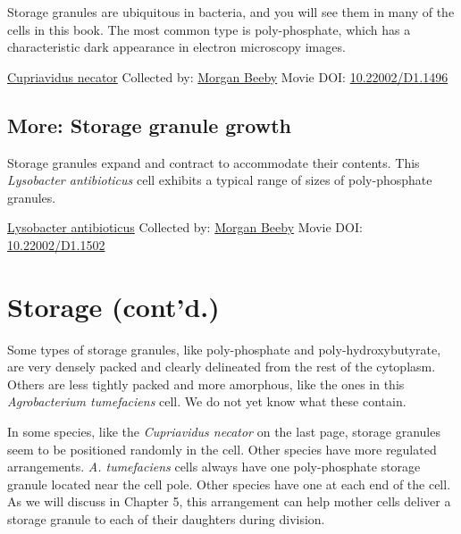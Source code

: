 \documentclass[]{tufte-book}
\begin{document}
Storage granules are ubiquitous in bacteria, and you will see them in many of the cells in this book. The most common type is poly-phosphate, which has a characteristic dark appearance in electron microscopy images.



\hypertarget{htmlwidget-879d68264eb224ebae14}{}

\label{fig:4-8}\protect\hyperlink{tree}{Cupriavidus necator} Collected by: \protect\hyperlink{morgan_beeby}{Morgan Beeby} Movie DOI: \href{https://doi.org/10.22002/D1.1496}{10.22002/D1.1496}

\hypertarget{Storage_granule_growth}{%
\subsection*{More: Storage granule growth}\label{Storage_granule_growth}}

Storage granules expand and contract to accommodate their contents. This \emph{Lysobacter antibioticus} cell exhibits a typical range of sizes of poly-phosphate granules.



\hypertarget{htmlwidget-27352afd61259e6a14fb}{}

\label{fig:4-8a}\protect\hyperlink{tree}{Lysobacter antibioticus} Collected by: \protect\hyperlink{morgan_beeby}{Morgan Beeby} Movie DOI: \href{https://doi.org/10.22002/D1.1502}{10.22002/D1.1502}

\hypertarget{storage-contd.}{%
\section{Storage (cont'd.)}\label{storage-contd.}}

Some types of storage granules, like poly-phosphate and poly-hydroxybutyrate, are very densely packed and clearly delineated from the rest of the cytoplasm. Others are less tightly packed and more amorphous, like the ones in this \emph{Agrobacterium tumefaciens} cell. We do not yet know what these contain.

In some species, like the \emph{Cupriavidus necator} on the last page, storage granules seem to be positioned randomly in the cell. Other species have more regulated arrangements. \emph{A. tumefaciens} cells always have one poly-phosphate storage granule located near the cell pole. Other species have one at each end of the cell. As we will discuss in Chapter 5, this arrangement can help mother cells deliver a storage granule to each of their daughters during division.
\end{document}
